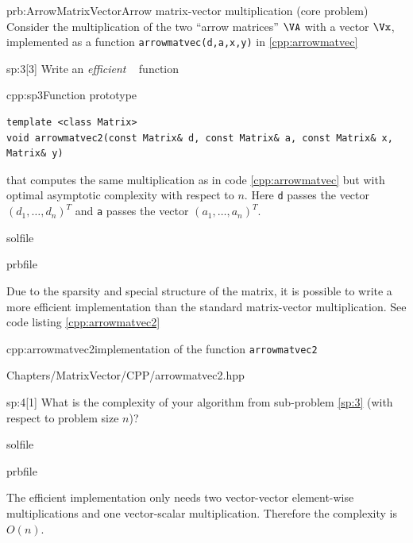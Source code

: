 \begin{samproblem}{prb:ArrowMatrixVector}{Arrow matrix-vector multiplication (core problem)}{
Consider the multiplication of the two ``arrow matrices'' $\VA$ with a vector $\Vx$,
implemented as a function \texttt{arrowmatvec(d,a,x,y)} in \cref{cpp:arrowmatvec}
}
\begin{subproblem}{sp:3}[3]
  Write an \emph{efficient} \cpp~ function 
  \begin{samcode}[C++-code]{cpp:sp3}{Function prototype}
    \begin{lstlisting}[style=cpp]
template <class Matrix>
void arrowmatvec2(const Matrix& d, const Matrix& a, const Matrix& x, Matrix& y)
    \end{lstlisting}
  \end{samcode}
  that computes the same multiplication as in code \ref{cpp:arrowmatvec} but with optimal asymptotic complexity with respect to {$n$}.
  Here \texttt{d} passes the vector $(d_{1},\ldots,d_{n})^{T}$ and \texttt{a} passes the vector $(a_{1},\ldots,a_{n})^{T}$.

  \begin{samwriteprbpart}{solfile}
    \begin{writeverbatim}{prbfile}
      \begin{samsolution}
      Due to the sparsity and special structure of the matrix, it is possible to write a more efficient implementation than the standard matrix-vector multiplication. 
      See code listing \ref{cpp:arrowmatvec2}

      \begin{samcode}[C++-code]{cpp:arrowmatvec2}{implementation of the function \texttt{arrowmatvec2}}
        
        {Chapters/MatrixVector/CPP/arrowmatvec2.hpp}
      \end{samcode}

      \end{samsolution}
    \end{writeverbatim}
  \end{samwriteprbpart}

\end{subproblem}

\begin{subproblem}{sp:4}[1]
  What is the complexity of your algorithm from sub-problem \ref{sp:3} (with respect to problem size $n$)? 

  \begin{samwriteprbpart}{solfile}
    \begin{writeverbatim}{prbfile}
      \begin{samsolution}
      The efficient implementation only needs two vector-vector element-wise multiplications and one vector-scalar multiplication. 
      Therefore the complexity is $O(n)$.
      \end{samsolution}
    \end{writeverbatim}
  \end{samwriteprbpart}


\end{subproblem}
\end{samproblem}
